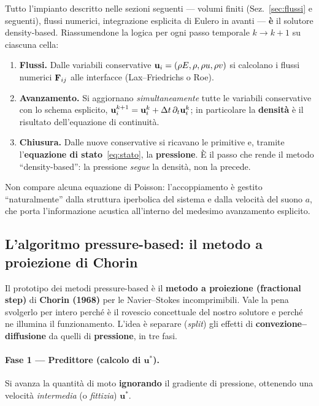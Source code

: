 Tutto l'impianto descritto nelle sezioni seguenti --- volumi finiti
(Sez.~\ref{sec:flussi} e seguenti), flussi numerici, integrazione esplicita di Eulero
in avanti --- \textbf{è} il solutore density-based. Riassumendone la logica per ogni
passo temporale $k\to k+1$ su ciascuna cella:
\begin{enumerate}
  \item \textbf{Flussi.} Dalle variabili conservative $\mathbf{u}_i=(\rho E,\rho,\rho u,\rho v)$
    si calcolano i flussi numerici $\mathbf{F}_{ij}$ alle interfacce (Lax--Friedrichs o Roe).
  \item \textbf{Avanzamento.} Si aggiornano \emph{simultaneamente} tutte le variabili
    conservative con lo schema esplicito,
    $\mathbf{u}_i^{k+1}=\mathbf{u}_i^{k}+\Delta t\,\partial_t\mathbf{u}_i^{k}$; in particolare la
    \textbf{densità} è il risultato dell'equazione di continuità.
  \item \textbf{Chiusura.} Dalle nuove conservative si ricavano le primitive e, tramite
    l'\textbf{equazione di stato}~\eqref{eq:stato}, la \textbf{pressione}. È il passo che
    rende il metodo ``density-based'': la pressione \emph{segue} la densità, non la
    precede.
\end{enumerate}
Non compare alcuna equazione di Poisson: l'accoppiamento è gestito ``naturalmente'' dalla
struttura iperbolica del sistema e dalla velocità del suono $a$, che porta l'informazione
acustica all'interno del medesimo avanzamento esplicito.

\subsection{L'algoritmo pressure-based: il metodo a proiezione di Chorin}
\label{sub:chorin}

Il prototipo dei metodi pressure-based è il \textbf{metodo a proiezione (fractional
step)} di \textbf{Chorin (1968)} per le Navier--Stokes incomprimibili. Vale la pena
svolgerlo per intero perché è il rovescio concettuale del nostro solutore e perché ne
illumina il funzionamento. L'idea è separare (\emph{split}) gli effetti di
\textbf{convezione--diffusione} da quelli di \textbf{pressione}, in tre fasi.

\paragraph{Fase 1 --- Predittore (calcolo di $\bm u^*$).} Si avanza la quantità di moto
\textbf{ignorando} il gradiente di pressione, ottenendo una velocità
\emph{intermedia} (o \emph{fittizia}) $\bm u^*$.

